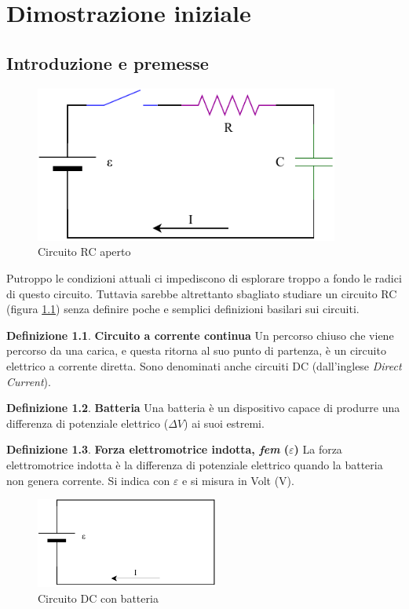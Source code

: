 \documentclass[a3paper, twoside, openany]{book}
\theoremstyle{definition}
\newtheorem{definition}{Definizione}
\begin{document}
\chapter{Dimostrazione iniziale}
\section{Introduzione e premesse}
\begin{figure}[htp]
    \centering
    \includegraphics[width=10cm]{Circuito RC-Aperto}
    \caption{Circuito RC aperto}
    \label{fig:RC-aperto}
\end{figure}
Putroppo le condizioni attuali ci impediscono di esplorare troppo a fondo le radici di questo circuito. Tuttavia sarebbe altrettanto sbagliato studiare un circuito RC (figura \ref{fig:RC-aperto}) senza definire poche e semplici definizioni basilari sui circuiti.
\theoremstyle{definition}
\begin{definition}{\textbf{Circuito a corrente continua}}
Un percorso chiuso che viene percorso da una carica, e questa ritorna al suo punto di partenza, è un circuito elettrico a corrente diretta. Sono denominati anche circuiti DC (dall'inglese \emph{Direct Current}).
\end{definition}
\begin{definition}{\textbf{Batteria}}
Una batteria è un dispositivo capace di produrre una differenza di potenziale elettrico ($\Delta V$) ai suoi estremi.
\end{definition}
\begin{definition}{\textbf{Forza elettromotrice indotta, \emph{fem} ($\varepsilon$)}}
La forza elettromotrice indotta è la differenza di potenziale elettrico quando la batteria non genera corrente. Si indica con $\varepsilon$ e si misura in Volt (V).
\end{definition}
\begin{figure}[htp]
    \centering
    \includegraphics[width=6cm]{Circuito RC-Batteria}
    \caption{Circuito DC con batteria}
    \label{fig:batteria}
\end{figure}
\end{document}
